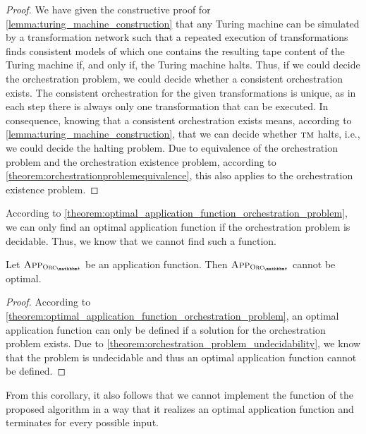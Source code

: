 \begin{proof}
    We have given the constructive proof for \autoref{lemma:turing_machine_construction} that any Turing machine can be simulated by a transformation network such that a repeated execution of transformations finds consistent models of which one contains the resulting tape content of the Turing machine if, and only if, the Turing machine halts.
    Thus, if we could decide the orchestration problem, we could decide whether a consistent orchestration exists. 
    The consistent orchestration for the given transformations is unique, as in each step there is always only one transformation that can be executed.
    In consequence, knowing that a consistent orchestration exists means, according to \autoref{lemma:turing_machine_construction}, that we can decide whether $\textsc{tm}$ halts, i.e., we could decide the halting problem.
    Due to equivalence of the orchestration problem and the orchestration existence problem, according to \autoref{theorem:orchestrationproblemequivalence}, this also applies to the orchestration existence problem.
\end{proof}

According to \autoref{theorem:optimal_application_function_orchestration_problem}, we can only find an optimal application function if the orchestration problem is decidable.
Thus, we know that we cannot find such a function.

\begin{corollary}
    \label{corollary:nooptimalapplication}
    Let $\appfunction{\orcfunction{\transformationset{T}}}$ be an application function. Then $\appfunction{\orcfunction{\transformationset{T}}}$ cannot be optimal.
\end{corollary}

\begin{proof}
    According to \autoref{theorem:optimal_application_function_orchestration_problem}, an optimal application function can only be defined if a solution for the orchestration problem exists.
    Due to \autoref{theorem:orchestration_problem_undecidability}, we know that the problem is undecidable and thus an optimal application function cannot be defined.
\end{proof}

From this corollary, it also follows that we cannot implement the  function of the proposed algorithm in a way that it realizes an optimal application function and terminates for every possible input.

